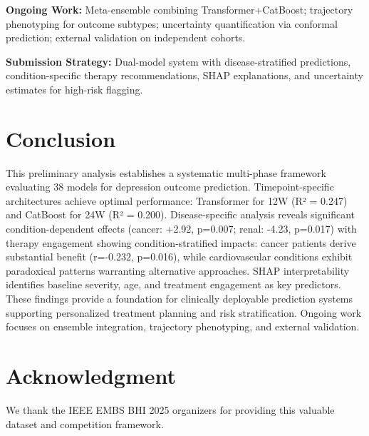 \documentclass[conference]{IEEEtran}
\begin{document}
\textbf{Ongoing Work:} Meta-ensemble combining Transformer+CatBoost; trajectory phenotyping for outcome subtypes; uncertainty quantification via conformal prediction; external validation on independent cohorts.

\textbf{Submission Strategy:} Dual-model system with disease-stratified predictions, condition-specific therapy recommendations, SHAP explanations, and uncertainty estimates for high-risk flagging.

\section{Conclusion}

This preliminary analysis establishes a systematic multi-phase framework evaluating 38 models for depression outcome prediction. Timepoint-specific architectures achieve optimal performance: Transformer for 12W (R² = 0.247) and CatBoost for 24W (R² = 0.200). Disease-specific analysis reveals significant condition-dependent effects (cancer: +2.92, p=0.007; renal: -4.23, p=0.017) with therapy engagement showing condition-stratified impacts: cancer patients derive substantial benefit (r=-0.232, p=0.016), while cardiovascular conditions exhibit paradoxical patterns warranting alternative approaches. SHAP interpretability identifies baseline severity, age, and treatment engagement as key predictors. These findings provide a foundation for clinically deployable prediction systems supporting personalized treatment planning and risk stratification. Ongoing work focuses on ensemble integration, trajectory phenotyping, and external validation.

\section*{Acknowledgment}
We thank the IEEE EMBS BHI 2025 organizers for providing this valuable dataset and competition framework.
\end{document}
